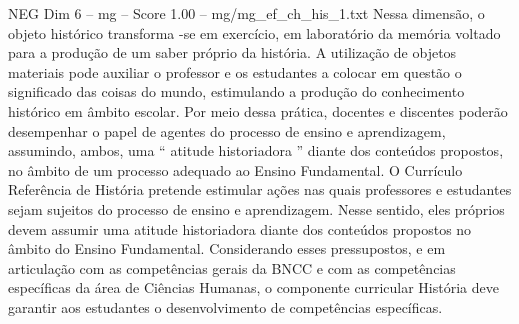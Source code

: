 \begin{textsample}{NEG Dim 6 – mg – Score 1.00 – mg/mg\_ef\_ch\_his\_1.txt}
Nessa dimensão, o objeto histórico transforma -se em exercício, em laboratório da memória voltado para a produção de um saber próprio da história.
A utilização de objetos materiais pode auxiliar o professor e os estudantes a colocar em questão o significado das coisas do mundo, estimulando a produção do conhecimento histórico em âmbito escolar.
Por meio dessa prática, docentes e discentes poderão desempenhar o papel de agentes do processo de ensino e aprendizagem, assumindo, ambos, uma “ atitude historiadora ” diante dos conteúdos propostos, no âmbito de um processo adequado ao Ensino Fundamental.
O Currículo Referência de História pretende estimular ações nas quais professores e estudantes sejam sujeitos do processo de ensino e aprendizagem.
Nesse sentido, eles próprios devem assumir uma atitude historiadora diante dos conteúdos propostos no âmbito do Ensino Fundamental.
Considerando esses pressupostos, e em articulação com as competências gerais da BNCC e com as competências específicas da área de Ciências Humanas, o componente curricular História deve garantir aos estudantes o desenvolvimento de competências específicas.

\end{textsample}
